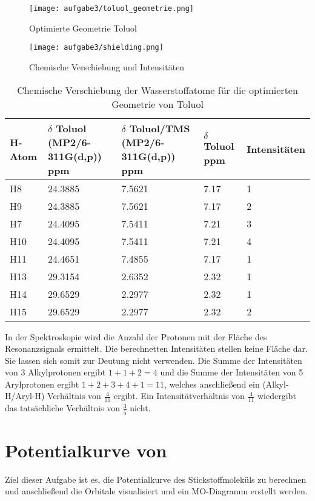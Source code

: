 \documentclass[12pt]{article}
\begin{document}
\begin{onehalfspace}
\begin{figure}[!htpb]
\centering
  \texttt{[image: aufgabe3/toluol\_geometrie.png]}%
  \caption{Optimierte Geometrie Toluol}
\end{figure}
\begin{figure}[!htbp]
\centering
  \texttt{[image: aufgabe3/shielding.png]}%
  \caption{Chemische Verschiebung und Intensitäten}
\end{figure}

\begin{table}[!htpb]
\centering
\caption{Chemische Verschiebung der Wasserstoffatome für die optimierten Geometrie von Toluol}
\begin{tabular}{lllll}
\toprule
H-Atom  & \parbox[t]{4cm}{$\delta$ Toluol \\ (MP2/6-311G(d,p))\\ ppm} & \parbox[t]{4cm}{$\delta$ Toluol/TMS \\ (MP2/6-311G(d,p)) \\ ppm} &  \parbox[t]{4cm}{$\delta$ Toluol\cite{zeeh} ppm} & Intensitäten\\
\midrule
H8 & 24.3885  & 7.5621 & 7.17 & 1  \\ 
H9 & 24.3885  & 7.5621 & 7.17 & 2  \\ 
H7 & 24.4095  & 7.5411 & 7.21 & 3  \\ 
H10 & 24.4095 & 7.5411 & 7.21 & 4 \\ 
H11 & 24.4651 & 7.4855 & 7.17 & 1 \\ 
H13 & 29.3154 & 2.6352 & 2.32 & 1 \\ 
H14 & 29.6529 & 2.2977 & 2.32 & 1 \\ 
H15 & 29.6529 & 2.2977 & 2.32 & 2 \\ 
\bottomrule
\end{tabular}
\end{table}
\noindent
\newpage
In der  Spektroskopie wird die Anzahl der Protonen mit der Fläche des Resonanzsignals ermittelt. Die berechnetten Intensitäten stellen keine Fläche dar. Sie lassen sich somit zur Deutung nicht verwenden. Die Summe der Intensitäten von 3 Alkylprotonen ergibt $1 + 1 + 2 = 4$  und die Summe der Intensitäten von 5 Arylprotonen ergibt $1+2+3+4+1 = 11 $, welches anschließend ein (Alkyl-H/Aryl-H) Verhältnis von $\frac{4}{11}$ ergibt. Ein Intensitätverhältnis von $\frac{4}{11}$ wiedergibt das tatsächliche Verhältnis von $\frac{3}{5}$ nicht.

\section{Potentialkurve von }
Ziel dieser Aufgabe ist es, die Potentialkurve des Stickstoffmoleküls zu berechnen und anschließend die Orbitale visualisiert und ein MO-Diagramm erstellt werden.

\end{onehalfspace}
\end{document}
